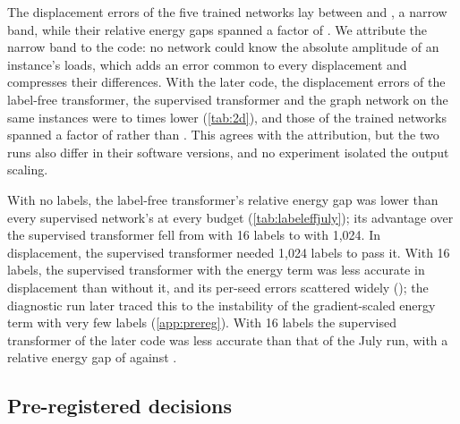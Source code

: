 The displacement errors of the five trained networks lay between \numTwoLabDisp{} and
\numTwoMgnDisp{}, a narrow band, while their relative energy gaps spanned a factor of
\numTwoGapSpread{}. We attribute the narrow band to the code: no network could know the
absolute amplitude of an instance's loads, which adds an error common to every displacement
and compresses their differences. With the later code, the displacement errors of the
label-free transformer, the supervised transformer and the graph network on the same
instances were \numJulyOverCmDispMin{} to \numJulyOverCmDispMax{} times lower
(\cref{tab:2d}), and those of the trained networks spanned a factor of \numCmDispSpread{}
rather than \numTwoDispSpread{}. This agrees with the attribution, but the two runs also
differ in their software versions, and no experiment isolated the output scaling.



With no labels, the label-free transformer's relative energy gap was lower than every
supervised network's at every budget (\cref{tab:labeleffjuly}); its advantage over the
supervised transformer fell from \numTwoAdvMax{} with 16 labels to \numTwoAdvMin{} with
1,024. In displacement, the supervised transformer needed 1,024 labels to pass it. With 16
labels, the supervised transformer with the energy term was less accurate in displacement
than without it, and its per-seed errors scattered widely (\numTwoAncSixteenSeeds{}); the
diagnostic run later traced this to the instability of the gradient-scaled energy term with
very few labels (\ref{app:prereg}). With 16 labels the supervised transformer of the later
code was less accurate than that of the July run, with a relative energy gap of
\numCmLabGapSixteen{} against \numTwoLabGapSixteen{}.

\subsection{Pre-registered decisions}\label{app:july:decisions}

